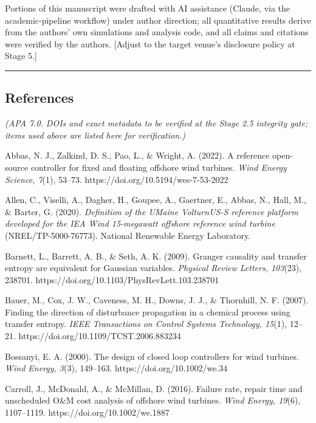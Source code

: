 \documentclass[
  english,
  11pt,
]{article}
\begin{document}
Portions of this manuscript were drafted with AI assistance (Claude, via
the academic-pipeline workflow) under author direction; all quantitative
results derive from the authors' own simulations and analysis code, and
all claims and citations were verified by the authors. {[}Adjust to the
target venue's disclosure policy at Stage 5.{]}

\begin{center}\rule{0.5\linewidth}{0.5pt}\end{center}

\subsection{References}\label{references}

\emph{(APA 7.0. DOIs and exact metadata to be verified at the Stage 2.5
integrity gate; items used above are listed here for verification.)}

Abbas, N. J., Zalkind, D. S., Pao, L., \& Wright, A. (2022). A reference
open-source controller for fixed and floating offshore wind turbines.
\emph{Wind Energy Science, 7}(1), 53--73.
https://doi.org/10.5194/wes-7-53-2022

Allen, C., Viselli, A., Dagher, H., Goupee, A., Gaertner, E., Abbas, N.,
Hall, M., \& Barter, G. (2020). \emph{Definition of the UMaine
VolturnUS-S reference platform developed for the IEA Wind 15-megawatt
offshore reference wind turbine} (NREL/TP-5000-76773). National
Renewable Energy Laboratory.

Barnett, L., Barrett, A. B., \& Seth, A. K. (2009). Granger causality
and transfer entropy are equivalent for Gaussian variables.
\emph{Physical Review Letters, 103}(23), 238701.
https://doi.org/10.1103/PhysRevLett.103.238701

Bauer, M., Cox, J. W., Caveness, M. H., Downs, J. J., \& Thornhill, N.
F. (2007). Finding the direction of disturbance propagation in a
chemical process using transfer entropy. \emph{IEEE Transactions on
Control Systems Technology, 15}(1), 12--21.
https://doi.org/10.1109/TCST.2006.883234

Bossanyi, E. A. (2000). The design of closed loop controllers for wind
turbines. \emph{Wind Energy, 3}(3), 149--163.
https://doi.org/10.1002/we.34

Carroll, J., McDonald, A., \& McMillan, D. (2016). Failure rate, repair
time and unscheduled O\&M cost analysis of offshore wind turbines.
\emph{Wind Energy, 19}(6), 1107--1119. https://doi.org/10.1002/we.1887
\end{document}
